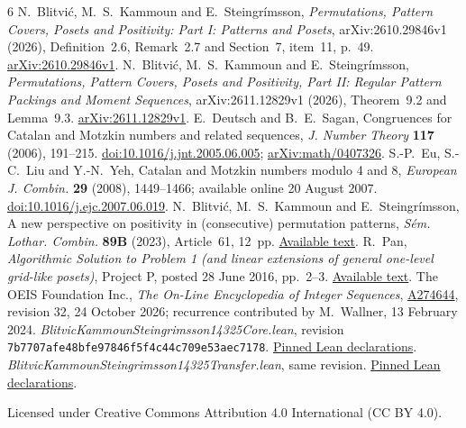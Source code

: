 \documentclass[11pt]{article}
\begin{document}
\begin{thebibliography}{6}
N.~Blitvi\'c, M.~S.~Kammoun and E.~Steingr\'imsson,
\emph{Permutations, Pattern Covers, Posets and Positivity:
Part I: Patterns and Posets}, arXiv:2610.29846v1 (2026),
Definition~2.6, Remark~2.7 and Section~7, item~11, p.~49.
\href{https://arxiv.org/abs/2610.29846v1}{arXiv:2610.29846v1}.
N.~Blitvi\'c, M.~S.~Kammoun and E.~Steingr\'imsson,
\emph{Permutations, Pattern Covers, Posets and Positivity, Part II:
Regular Pattern Packings and Moment Sequences},
arXiv:2611.12829v1 (2026), Theorem~9.2 and Lemma~9.3.
\href{https://arxiv.org/abs/2611.12829v1}{arXiv:2611.12829v1}.
E.~Deutsch and B.~E.~Sagan,
Congruences for Catalan and Motzkin numbers and related sequences,
\emph{J. Number Theory} \textbf{117} (2006), 191--215.
\href{https://doi.org/10.1016/j.jnt.2005.06.005}{doi:10.1016/j.jnt.2005.06.005};
\href{https://arxiv.org/abs/math/0407326}{arXiv:math/0407326}.
S.-P.~Eu, S.-C.~Liu and Y.-N.~Yeh,
Catalan and Motzkin numbers modulo 4 and 8,
\emph{European J. Combin.} \textbf{29} (2008), 1449--1466;
available online 20 August 2007.
\href{https://doi.org/10.1016/j.ejc.2007.06.019}{doi:10.1016/j.ejc.2007.06.019}.
N.~Blitvi\'c, M.~S.~Kammoun and E.~Steingr\'imsson,
A new perspective on positivity in (consecutive) permutation patterns,
\emph{S\'em. Lothar. Combin.} \textbf{89B} (2023), Article~61, 12~pp.
\href{https://www.mat.univie.ac.at/~slc/wpapers/FPSAC2023/61.pdf}{Available text}.
R.~Pan, \emph{Algorithmic Solution to Problem 1
(and linear extensions of general one-level grid-like posets)},
Project P, posted 28 June 2016, pp.~2--3.
\href{https://mathweb.ucsd.edu/~projectp/problems/solutions/OneLevelGridPoset.pdf}{Available text}.
The OEIS Foundation Inc., \emph{The On-Line Encyclopedia of Integer Sequences},
\href{https://oeis.org/A274644}{A274644}, revision 32, 24 October 2026;
recurrence contributed by M.~Wallner, 13 February 2024.
\emph{BlitvicKammounSteingrimsson14325Core.lean},
\newline revision \texttt{7b7707afe48bfe97846f5f4c44c709e53aec7178}.
\href{https://github.com/the-omega-institute/trureturing/blob/7b7707afe48bfe97846f5f4c44c709e53aec7178/D5/S3/Combinatorics/Permutation/BlitvicKammounSteingrimsson14325Core.lean}{Pinned Lean declarations}.
\emph{BlitvicKammounSteingrimsson14325Transfer.lean}, same revision.
\href{https://github.com/the-omega-institute/trureturing/blob/7b7707afe48bfe97846f5f4c44c709e53aec7178/D5/S3/Combinatorics/Permutation/BlitvicKammounSteingrimsson14325Transfer.lean}{Pinned Lean declarations}.
\end{thebibliography}
\noindent\small Licensed under Creative Commons Attribution 4.0 International
(CC BY 4.0).
\end{document}
